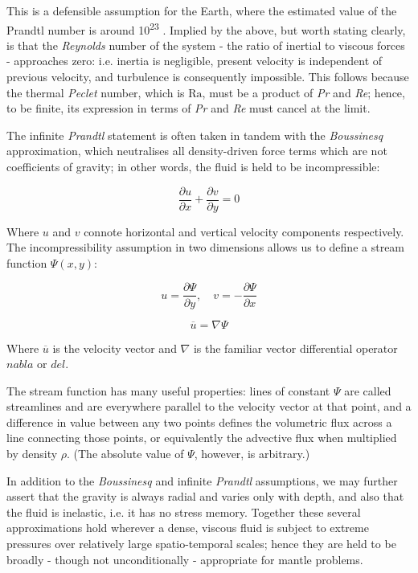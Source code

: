 \documentclass[a4paper,11pt,oneside]{book}
\begin{document}
This is a defensible assumption for the Earth, where the estimated value of the Prandtl number is around 10\textsuperscript{23} \cite{Schubert2001-ea}. Implied by the above, but worth stating clearly, is that the \textit{Reynolds} number of the system - the ratio of inertial to viscous forces - approaches zero: i.e. inertia is negligible, present velocity is independent of previous velocity, and turbulence is consequently impossible. This follows because the thermal \textit{Peclet} number, which is $\mathrm{Ra}$, must be a product of \textit{Pr} and \textit{Re}; hence, to be finite, its expression in terms of \textit{Pr} and \textit{Re} must cancel at the limit.

The infinite \textit{Prandtl} statement is often taken in tandem with the \textit{Boussinesq} approximation, which neutralises all density-driven force terms which are not coefficients of gravity; in other words, the fluid is held to be incompressible:

\begin{equation}
\frac{\partial u}{\partial x} + \frac{\partial v}{\partial y} = 0
\end{equation}

Where $u$ and $v$ connote horizontal and vertical velocity components respectively. The incompressibility assumption in two dimensions allows us to define a stream function $\Psi(x, y)$:

\begin{equation}
u = \frac{\partial \Psi}{\partial y}, \quad v = -\frac{\partial \Psi}{\partial x}
\end{equation}

\begin{equation}
\overline{u} = \nabla \Psi
\end{equation}

Where $\overline{u}$ is the velocity vector and $\nabla$ is the familiar vector differential operator $nabla$ or $del$.

The stream function has many useful properties: lines of constant $\Psi$ are called streamlines and are everywhere parallel to the velocity vector at that point, and a difference in value between any two points defines the volumetric flux across a line connecting those points, or equivalently the advective flux when multiplied by density $\rho$. (The absolute value of $\Psi$, however, is arbitrary.)

In addition to the \textit{Boussinesq} and infinite \textit{Prandtl} assumptions, we may further assert that the gravity is always radial and varies only with depth, and also that the fluid is inelastic, i.e. it has no stress memory. Together these several approximations hold wherever a dense, viscous fluid is subject to extreme pressures over relatively large spatio-temporal scales; hence they are held to be broadly - though not unconditionally - appropriate for mantle problems.
\end{document}
